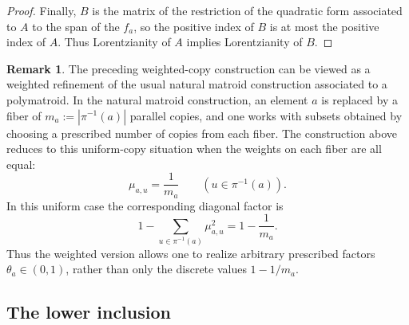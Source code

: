 \documentclass[12pt]{amsart}
\theoremstyle{definition}
\newtheorem{remark}[theorem]{Remark}
\newcommand{\1}{\mathbf{1}}
\newcommand\mb{\texorpdfstring{\textbf{Matt:} }{Matt: }}
\newcommand{\mk}[2][]{\todo[color=orange, #1]{\textbf{Mario}: #2}}
\begin{document}
\begin{proof}
Finally, $B$ is the matrix of the restriction of the quadratic form associated
to $A$ to the span of the $f_a$, so the positive index of $B$ is at most the
positive index of $A$.  Thus Lorentzianity of $A$ implies Lorentzianity of $B$.
\end{proof}

\begin{remark}
The preceding weighted-copy construction can be viewed as a weighted refinement
of the usual natural matroid construction associated to a polymatroid.  In the
natural matroid construction, an element $a$ is replaced by a fiber of
$m_a:=|\pi^{-1}(a)|$ parallel copies, and one works with subsets obtained by choosing a prescribed
number of copies from each fiber.  The construction above reduces to this
uniform-copy situation when the weights on each fiber are all equal:
\[
        \mu_{a,u}=\frac{1}{m_a}
        \qquad
        (u\in \pi^{-1}(a)).
\]
In this uniform case the corresponding diagonal factor is
\[
        1-\sum_{u\in \pi^{-1}(a)}\mu_{a,u}^2
        =
        1-\frac{1}{m_a}.
\]
Thus the weighted version allows one to realize arbitrary prescribed factors
$\theta_a\in(0,1)$, rather than only the discrete values $1-1/m_a$.
\end{remark}


\subsection{The lower inclusion}
\end{document}
